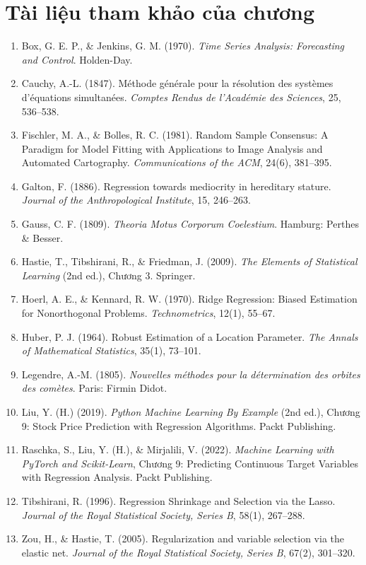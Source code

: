 \section*{Tài liệu tham khảo của chương}
\begin{enumerate}
    \item Box, G. E. P., \& Jenkins, G. M. (1970). \textit{Time Series Analysis: Forecasting and Control}. Holden-Day.
    \item Cauchy, A.-L. (1847). Méthode générale pour la résolution des systèmes d'équations simultanées. \textit{Comptes Rendus de l'Académie des Sciences}, 25, 536--538.
    \item Fischler, M. A., \& Bolles, R. C. (1981). Random Sample Consensus: A Paradigm for Model Fitting with Applications to Image Analysis and Automated Cartography. \textit{Communications of the ACM}, 24(6), 381--395.
    \item Galton, F. (1886). Regression towards mediocrity in hereditary stature. \textit{Journal of the Anthropological Institute}, 15, 246--263.
    \item Gauss, C. F. (1809). \textit{Theoria Motus Corporum Coelestium}. Hamburg: Perthes \& Besser.
    \item Hastie, T., Tibshirani, R., \& Friedman, J. (2009). \textit{The Elements of Statistical Learning} (2nd ed.), Chương 3. Springer.
    \item Hoerl, A. E., \& Kennard, R. W. (1970). Ridge Regression: Biased Estimation for Nonorthogonal Problems. \textit{Technometrics}, 12(1), 55--67.
    \item Huber, P. J. (1964). Robust Estimation of a Location Parameter. \textit{The Annals of Mathematical Statistics}, 35(1), 73--101.
    \item Legendre, A.-M. (1805). \textit{Nouvelles méthodes pour la détermination des orbites des comètes}. Paris: Firmin Didot.
    \item Liu, Y. (H.) (2019). \textit{Python Machine Learning By Example} (2nd ed.), Chương 9: Stock Price Prediction with Regression Algorithms. Packt Publishing.
    \item Raschka, S., Liu, Y. (H.), \& Mirjalili, V. (2022). \textit{Machine Learning with PyTorch and Scikit-Learn}, Chương 9: Predicting Continuous Target Variables with Regression Analysis. Packt Publishing.
    \item Tibshirani, R. (1996). Regression Shrinkage and Selection via the Lasso. \textit{Journal of the Royal Statistical Society, Series B}, 58(1), 267--288.
    \item Zou, H., \& Hastie, T. (2005). Regularization and variable selection via the elastic net. \textit{Journal of the Royal Statistical Society, Series B}, 67(2), 301--320.
\end{enumerate}
